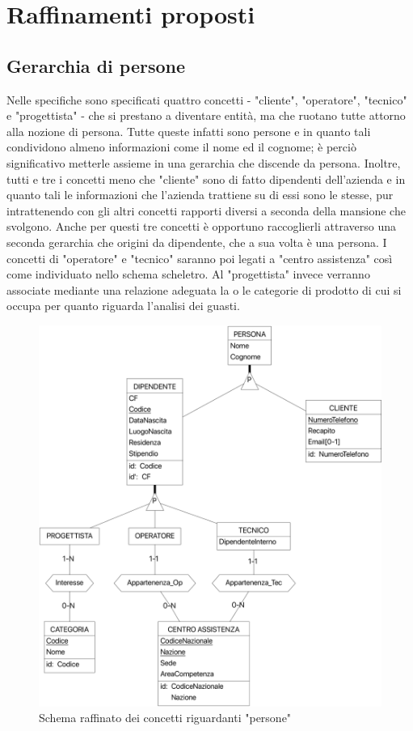 \documentclass[a4paper, 12pt]{report}
\begin{document}
\section{Raffinamenti proposti}

\subsection{Gerarchia di persone}

Nelle specifiche sono specificati quattro concetti - "cliente", "operatore", "tecnico" e "progettista" - che si prestano a diventare entità, ma
che ruotano tutte attorno alla nozione di persona. Tutte queste infatti sono persone e in quanto tali condividono almeno informazioni come il nome
ed il cognome; è perciò significativo metterle assieme in una gerarchia che discende da persona. Inoltre, tutti e tre i concetti meno che "cliente"
sono di fatto dipendenti dell'azienda e in quanto tali le informazioni che l'azienda trattiene su di essi sono le stesse, pur intrattenendo con gli
altri concetti rapporti diversi a seconda della mansione che svolgono. Anche per questi tre concetti è opportuno raccoglierli attraverso una seconda
gerarchia che origini da dipendente, che a sua volta è una persona. I concetti di "operatore" e "tecnico" saranno poi legati a "centro assistenza"
così come individuato nello schema scheletro. Al "progettista" invece verranno associate mediante una relazione adeguata la o le categorie di prodotto 
di cui si occupa per quanto riguarda l'analisi dei guasti.

\begin{figure}[H]
	\centering
	\includegraphics[width=\linewidth]{images/persone.png}
	\caption{Schema raffinato dei concetti riguardanti "persone"}
\end{figure}
\end{document}
